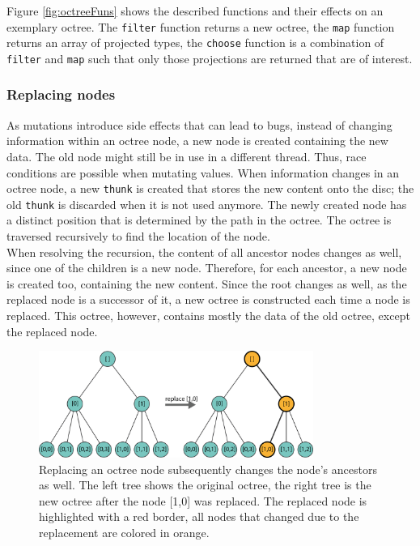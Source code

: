 Figure \ref{fig:octreeFuns} shows the described functions and their effects on an exemplary octree. The \verb|filter| function returns a new octree, the \verb|map| function returns an array of projected types, the \verb|choose| function is a combination of \verb|filter| and \verb|map| such that only those projections are returned that are of interest. 


\subsubsection{Replacing nodes}

As mutations introduce side effects that can lead to bugs, instead of changing information within an octree node, a new node is created containing the new data. The old node might still be in use in a different thread. Thus, race conditions are possible when mutating values. When information changes in an octree node, a new \verb|thunk| is created that stores the new content onto the disc; the old \verb|thunk| is discarded when it is not used anymore. The newly created node has a distinct position that is determined by the path in the octree. The octree is traversed recursively to find the location of the node. 
\\
When resolving the recursion, the content of all ancestor nodes changes as well, since one of the children is a new node. Therefore, for each ancestor, a new node is created too, containing the new content. Since the root changes as well, as the replaced node is a successor of it, a new octree is constructed each time a node is replaced. This octree, however, contains mostly the data of the old octree, except the replaced node. 

\begin{figure}[h]
    \centering
    \includegraphics[width=0.8\textwidth]{Implementation/octreeReplace.png}
    \caption[Example on replacing an octree node]
		{Replacing an octree node subsequently changes the node's ancestors as well. The left tree shows the original octree, the right tree is the new octree after the node [1,0] was replaced. The replaced node is highlighted with a red border, all nodes that changed due to the replacement are colored in orange. }
    \label{fig:octreeReplace}
\end{figure}

